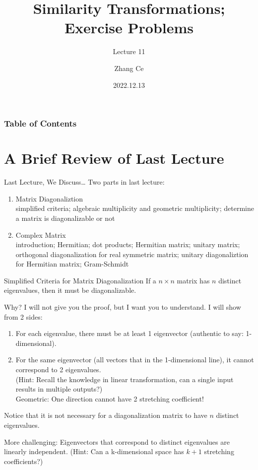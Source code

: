 \documentclass{beamer}
\title[Linear Algebra] %
{Similarity Transformations; Exercise Problems}
\subtitle{Lecture 11}
\author[zhangc2019@mail.sustech.edu.cn] %
{
    Zhang Ce
}
\institute[] %
{
    Department of Electrical and Electronic Engineering\\
    Southern University of Science and Technology
}
\date[2022.12.13] %
{2022.12.13}
\begin{document}
\frame{\titlepage}


\begin{frame}
\frametitle{Table of Contents}
\tableofcontents
\end{frame}
\section{A Brief Review of Last Lecture}
\begin{frame}{Last Lecture, We Discuss\dots}
Two parts in last lecture:
    \begin{enumerate}
        \item Matrix Diagonaliztion\\
        simplified criteria; algebraic multiplicity and geometric multiplicity; determine a matrix is diagonalizable or not
        \item Complex Matrix\\
        introduction; Hermitian; dot products; Hermitian matrix; unitary matrix; orthogonal diagonalization for real symmetric matrix; unitary diagonaliztion for Hermitian matrix; Gram-Schmidt
    \end{enumerate}

\end{frame}

\begin{frame}{Simplified Criteria for Matrix Diagonalization}
If a $n\times n$ matrix has $n$ distinct eigenvalues, then it must be diagonalizable.

\vspace{3pt}
Why? I will not give you the proof, but I want you to understand. I will show from 2 sides:

\begin{enumerate}
    \item For each eigenvalue, there must be at least 1 eigenvector (authentic to say: 1-dimensional).
    \item For the same eigenvector (all vectors that in the 1-dimensional line), it cannot correspond to 2 eigenvalues.\\
    (Hint: Recall the knowledge in linear transformation, can a single input results in multiple outputs?)\\
    Geometric: One direction cannot have 2 stretching coefficient!
\end{enumerate}

Notice that it is not necessary for a diagonalization matrix to have $n$ distinct eigenvalues.

\vspace{3pt}
More challenging: Eigenvectors that correspond to distinct eigenvalues are linearly independent. (Hint: Can a k-dimensional space has $k+1$ stretching coefficients?)

\end{frame}
\end{document}
